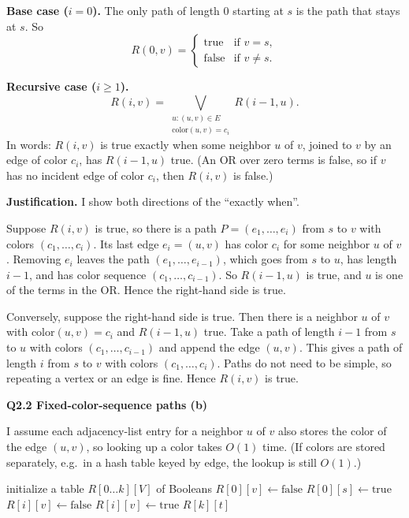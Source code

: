 \documentclass[11pt]{article}
\newcommand{\qpage}[1]{\clearpage\noindent\textbf{\large #1}\par\medskip}
\begin{document}
\textbf{Base case ($i=0$).}
The only path of length $0$ starting at $s$ is the path that stays at $s$.
So
\[
  R(0,v) = \begin{cases} \text{true} & \text{if } v = s,\\ \text{false} & \text{if } v \neq s. \end{cases}
\]

\textbf{Recursive case ($i \ge 1$).}
\[
  R(i,v) = \bigvee_{\substack{u : (u,v) \in E \\ \text{color}(u,v) = c_i}} R(i-1,u).
\]
In words: $R(i,v)$ is true exactly when some neighbor $u$ of $v$, joined to $v$ by an edge of color $c_i$, has $R(i-1,u)$ true.
(An OR over zero terms is false, so if $v$ has no incident edge of color $c_i$, then $R(i,v)$ is false.)

\textbf{Justification.}
I show both directions of the ``exactly when''.

Suppose $R(i,v)$ is true, so there is a path $P = (e_1,\dots,e_i)$ from $s$ to $v$ with colors $(c_1,\dots,c_i)$.
Its last edge $e_i = (u,v)$ has color $c_i$ for some neighbor $u$ of $v$.
Removing $e_i$ leaves the path $(e_1,\dots,e_{i-1})$, which goes from $s$ to $u$, has length $i-1$, and has color sequence $(c_1,\dots,c_{i-1})$.
So $R(i-1,u)$ is true, and $u$ is one of the terms in the OR.
Hence the right-hand side is true.

Conversely, suppose the right-hand side is true.
Then there is a neighbor $u$ of $v$ with $\text{color}(u,v) = c_i$ and $R(i-1,u)$ true.
Take a path of length $i-1$ from $s$ to $u$ with colors $(c_1,\dots,c_{i-1})$ and append the edge $(u,v)$.
This gives a path of length $i$ from $s$ to $v$ with colors $(c_1,\dots,c_i)$.
Paths do not need to be simple, so repeating a vertex or an edge is fine.
Hence $R(i,v)$ is true.
    

\qpage{Q2.2 Fixed-color-sequence paths (b)}

I assume each adjacency-list entry for a neighbor $u$ of $v$ also stores the color of the edge $(u,v)$, so looking up a color takes $O(1)$ time.
(If colors are stored separately, e.g.\ in a hash table keyed by edge, the lookup is still $O(1)$.)

\begin{algorithmic}[1]
    \State initialize a table $R[0\ldots k][V]$ of Booleans
     
      \State $R[0][v] \gets \text{false}$
    \EndFor
    \State $R[0][s] \gets \text{true}$
     
        \State $R[i][v] \gets \text{false}$
            \State $R[i][v] \gets \text{true}$
          \EndIf
        \EndFor
      \EndFor
    \EndFor
    \State \Return $R[k][t]$
  \EndFunction
\end{algorithmic}
\end{document}
